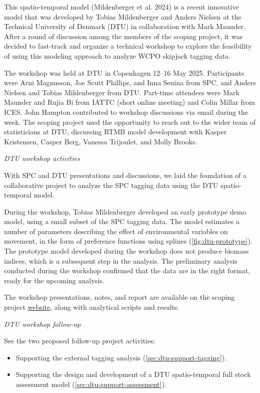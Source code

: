 \documentclass{SCreport}
\newcommand\tree
{https://github.com/PacificCommunity/ofp-sam-transition-plan/tree/main}
\begin{document}
This spatio-temporal model (Mildenberger et al. 2024) is a recent innovative
model that was developed by Tobias Mildenberger and Anders Nielsen at the
Technical University of Denmark (DTU) in collaboration with Mark Maunder. After
a round of discussion among the members of the scoping project, it was decided
to fast-track and organize a technical workshop to explore the feasibility of
using this modeling approach to analyze WCPO skipjack tagging data.

The workshop was held at DTU in Copenhagen 12--16 May 2025. Participants were
Arni Magnusson, Joe Scutt Phillips, and Inna Senina from SPC, and Anders Nielsen
and Tobias Mildenberger from DTU. Part-time attendees were Mark Maunder and
Rujia Bi from IATTC (short online meeting) and Colin Millar from ICES. John
Hampton contributed to workshop discussions via email during the week. The
scoping project used the opportunity to reach out to the wider team of
statisticians at DTU, discussing RTMB model development with Kasper Kristensen,
Casper Berg, Vanessa Trijoulet, and Molly Brooks.

\vspace{2ex}

\textit{DTU workshop activities}

With SPC and DTU presentations and discussions, we laid the foundation of a
collaborative project to analyze the SPC tagging data using the DTU
spatio-temporal model.

During the workshop, Tobias Mildenberger developed an early prototype demo
model, using a small subset of the SPC tagging data. The model estimates a
number of parameters describing the effect of environmental variables on
movement, in the form of preference functions using splines
(\autoref{fig:dtu-prototype}). The prototype model developed during the workshop
does not produce biomass indices, which is a subsequent step in the analysis.
The preliminary analysis conducted during the workshop confirmed that the data
are in the right format, ready for the upcoming analysis.

The workshop presentations, notes, and report are available on the scoping
project \href{\tree/workshops/2025-05-copenhagen}{website}, along with
analytical scripts and results.

\vspace{2ex}

\textit{DTU workshop follow-up}

See the two proposed follow-up project activities:

\begin{itemize}
  \item Supporting the external tagging analysis
  (\autoref{sec:dtu-support-tagging}).
  \item Supporting the design and development of a DTU spatio-temporal full
  stock assessment model (\autoref{sec:dtu-support-assessment}).
\end{itemize}
\end{document}
